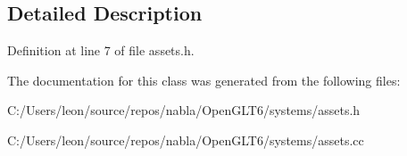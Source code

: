 \subsection{Detailed Description}


Definition at line 7 of file assets.\+h.



The documentation for this class was generated from the following files\+:\begin{DoxyCompactItemize}
\item 
C\+:/\+Users/leon/source/repos/nabla/\+Open\+G\+L\+T6/systems/assets.\+h\item 
C\+:/\+Users/leon/source/repos/nabla/\+Open\+G\+L\+T6/systems/assets.\+cc\end{DoxyCompactItemize}
